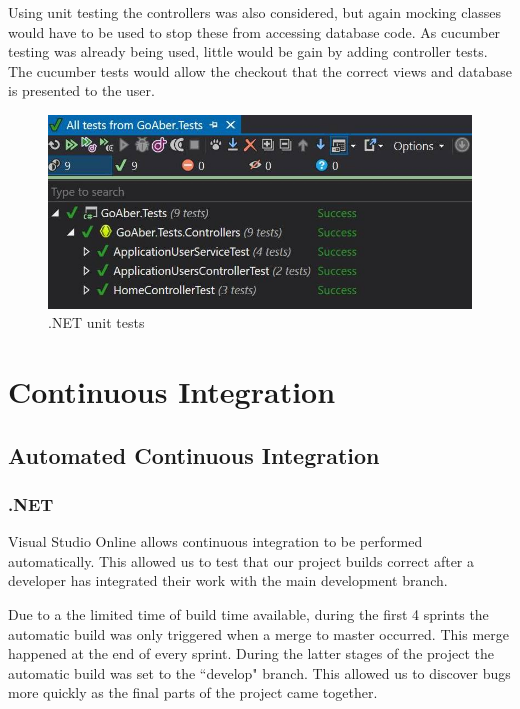 Using unit testing the controllers was also considered, but again mocking classes would have to be used to stop these from accessing database code. As cucumber testing was already being used, little would be gain by adding controller tests. The cucumber tests would allow the checkout that the correct views and database is presented to the user.

\begin{figure}[H]
\begin{center}
\includegraphics[scale=0.3]{images/testing/unitTestsNET.jpg} 
\caption{.NET unit tests}
\label{fig:testing_unitTestNET}
\end{center}
\end{figure}

\section{Continuous Integration}

\subsection{Automated Continuous Integration}
\subsubsection{.NET}

Visual Studio Online allows continuous integration to be performed automatically. This allowed us to test that our project builds correct after a developer has integrated their work with the main development branch.

Due to a the limited time of build time available, during the first 4 sprints the automatic build was only triggered when a merge to master occurred. This merge happened at the end of every sprint. During the latter stages of the project the automatic build was set to the ``develop" branch. This allowed us to discover bugs more quickly as the final parts of the project came together.

